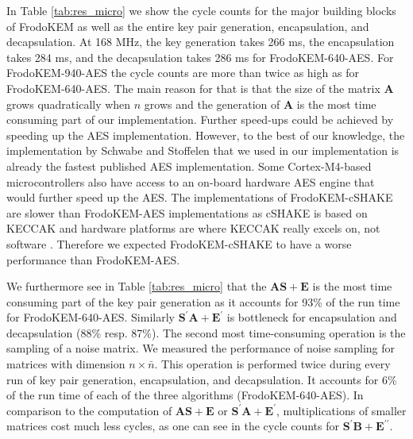 In Table \ref{tab:res_micro} we show the cycle counts for the major building blocks of \textsf{FrodoKEM} as well as the entire key pair generation, encapsulation, and decapsulation. At 168 MHz, the key generation takes 266 ms, the encapsulation takes 284 ms, and the decapsulation takes 286 ms for \textsf{FrodoKEM-640-AES}. For \textsf{FrodoKEM-940-AES} the cycle counts are more than twice as high as for \textsf{FrodoKEM-640-AES}. The main reason for that is that the size of the matrix $\mathbf{A}$ grows quadratically when $n$ grows and the generation of $\mathbf{A}$ is the most time consuming part of our implementation. Further speed-ups could be achieved by speeding up the AES implementation. However, to the best of our knowledge, the implementation by Schwabe and Stoffelen \cite{DBLP:conf/sacrypt/SchwabeS16} that we used in our implementation is already the fastest published AES implementation. Some Cortex-M4-based microcontrollers also have access to an on-board hardware AES engine that would further speed up the AES. The implementations of \textsf{FrodoKEM-cSHAKE} are slower than \textsf{FrodoKEM-AES} implementations as cSHAKE is based on KECCAK and hardware platforms are where KECCAK really excels on, not software \cite{SHA3}. Therefore we expected \textsf{FrodoKEM-cSHAKE} to have a worse performance than \textsf{FrodoKEM-AES}.  

We furthermore see in Table \ref{tab:res_micro} that the $\mathbf{AS} + \mathbf{E}$ is the most time consuming part of the key pair generation as it accounts for 93\% of the run time for \textsf{FrodoKEM-640-AES}. Similarly $\mathbf{S}^\prime \mathbf{A} + \mathbf{E}^\prime$ is bottleneck for encapsulation and decapsulation (88\% resp. 87\%). The second most time-consuming operation is the sampling of a noise matrix. We measured the performance of noise sampling for matrices with dimension $n \times \bar{n}$. This operation is performed twice during every run of key pair generation, encapsulation, and decapsulation. It accounts for 6\% of the run time of each of the three algorithms (\textsf{FrodoKEM-640-AES}). In comparison to the computation of $\mathbf{AS} + \mathbf{E}$ or $\mathbf{S}^\prime \mathbf{A} + \mathbf{E}^\prime$, multiplications of smaller matrices cost much less cycles, as one can see in the cycle counts for $\mathbf{S}^\prime \mathbf{B} + \mathbf{E}^{\prime\prime}$.


